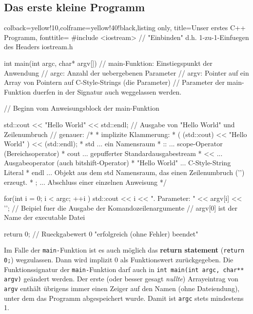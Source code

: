 \documentclass[a4paper]{report}
\begin{document}
\subsection{Das erste kleine Programm}
\begin{tcblisting}{colback=yellow!10,colframe=yellow!40!black,listing only,
		title=Unser erstes C++ Programm, fonttitle=\bfseries}
#include <iostream>
// "Einbinden" d.h. 1-zu-1-Einfuegen des Headers iostream.h

int main(int argc, char* argv[])
// main-Funktion: Einstiegspunkt der Anwendung
// argc: Anzahl der uebergebenen Parameter 
// argv: Pointer auf ein Array von Pointern auf C-Style-Strings (die Parameter)
// Parameter der main-Funktion duerfen in der Signatur auch weggelassen werden.

{   // Beginn vom Anweisungsblock der main-Funktion
	
	std::cout << "Hello World" << std::endl;
	// Ausgabe von "Hello World" und Zeilenumbruch
	// genauer:
	/*
	* implizite Klammerung:
	* (  (std::cout) << "Hello World"  ) << (std::endl);
	* std              ... ein Namensraum
	* ::               ... scope-Operator (Bereichsoperator)
	* cout            ... gepufferter Standardausgabestream
	* <<               ... Ausgabeoperator (auch bitshift-Operator)
	* "Hello World"    ... C-Style-String Literal
	* endl             ... Objekt aus dem std Namensraum, das einen Zeilenumbruch ('\n') erzeugt.
	* ;                ... Abschluss einer einzelnen Anweisung
	*/
	
	for(int i = 0; i < argc; ++i ){
		std::cout << i << ". Parameter:  " << argv[i] << '\n';
	} // Beipiel fuer die Ausgabe der Komandozeilenargumente
	// argv[0] ist der Name der executable Datei
	
	return 0; // Rueckgabewert 0 "erfolgreich (ohne Fehler) beendet"
}
\end{tcblisting}
Im Falle der \texttt{main-}Funktion ist es auch möglich das \textbf{return statement} (\texttt{return 0;}) wegzulassen. Dann wird implizit 0 als Funktionswert zurückgegeben. Die Funktionssignatur der \texttt{main-}Funktion darf auch in \texttt{int main(int argc, char** argv)} geändert werden. Der erste (oder besser gesagt \textit{nullte}) Arrayeintrag von \texttt{argv} enthält übrigens immer einen Zeiger auf den Namen (ohne Dateiendung), unter dem das Programm abgespeichert wurde. Damit ist \texttt{argc} stets mindestens 1. 
\end{document}
